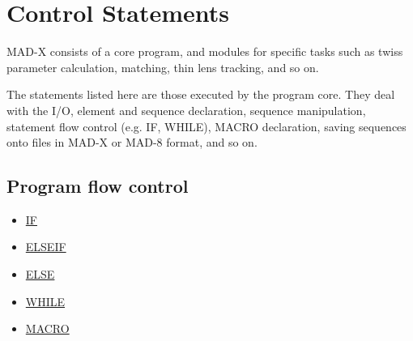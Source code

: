 

%
%
%
%


\section{Control Statements}

MAD-X consists of a core program, and modules for specific tasks such as
twiss parameter calculation, matching, thin lens tracking, and so on.  
 
The statements listed here are those executed by the program core. They
deal with the I/O, element and sequence declaration, sequence
manipulation, statement flow control (e.g. IF, WHILE), MACRO
declaration, saving sequences onto files in MAD-X or MAD-8 format, and
so on.  


\subsection{Program flow control}
\begin{itemize}
	\item \href{special.html#if}{IF}
	\item \href{special.html#elseif}{ELSEIF}
	\item \href{special.html#else}{ELSE}
	\item \href{special.html#while}{WHILE}
	\item \href{special.html#macro}{MACRO}
\end{itemize}


